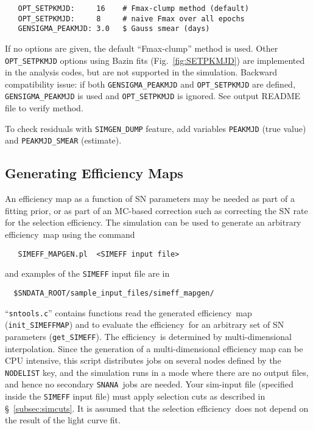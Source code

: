 \documentclass[12pt]{article}
\newcommand{\snana}{{\tt SNANA}}
\newcommand{\eff}{efficiency}
\begin{document}
\begin{verbatim}
   OPT_SETPKMJD:     16    # Fmax-clump method (default)
   OPT_SETPKMJD:     8     # naive Fmax over all epochs
   GENSIGMA_PEAKMJD: 3.0   $ Gauss smear (days)
\end{verbatim}
%
If no options are given, the default ``Fmax-clump'' method is used.
Other {\tt OPT\_SETPKMJD} options using Bazin fits 
(Fig.~\ref{fig:SETPKMJD})
are implemented in the analysis codes, but are not supported 
in the simulation.
Backward compatibility issue: 
if both {\tt GENSIGMA\_PEAKMJD} and {\tt OPT\_SETPKMJD} are
defined, {\tt GENSIGMA\_PEAKMJD} is used and
{\tt OPT\_SETPKMJD} is ignored. 
See output README file to verify method.

To check residuals with {\tt SIMGEN\_DUMP} feature,
add variables {\tt PEAKMJD} (true value) and {\tt PEAKMJD\_SMEAR}
(estimate).

   \subsection{Generating Efficiency Maps}
   \label{subsec:simeff_genmap}

An efficiency map as a function of SN parameters may be
needed as part of a fitting prior, or as part of an
MC-based correction such as correcting the SN rate
for the selection \eff.
The simulation can be used to generate an arbitrary 
\eff\ map using the command
\begin{verbatim}
   SIMEFF_MAPGEN.pl  <SIMEFF input file>
\end{verbatim}
%
and examples of the {\tt SIMEFF} input file are in
\begin{verbatim}
  $SNDATA_ROOT/sample_input_files/simeff_mapgen/
\end{verbatim}
``{\tt sntools.c}'' contains functions read the generated 
\eff\ map  ({\tt init\_SIMEFFMAP}) and to evaluate the \eff\
for an arbitrary set of SN parameters ({\tt get\_SIMEFF}).
The \eff\ is determined by multi-dimensional interpolation.
%
Since the generation of a multi-dimensional efficiency map 
can be CPU intensive, this script distributes jobs on several 
nodes defined by the {\tt NODELIST} key, and the simulation 
runs in a mode where there are no output files, 
and hence no secondary \snana\ jobs are needed.
Your sim-input file (specified inside the {\tt SIMEFF} input file) 
must apply selection cuts as described in \S~\ref{subsec:simcuts}.
It is assumed that the selection \eff\ does not depend on
the result of the light curve fit.
\end{document}
